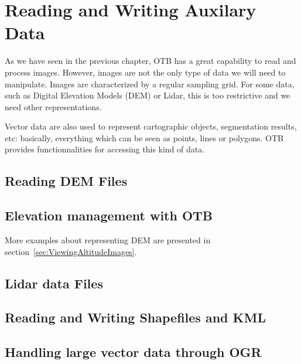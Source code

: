 \chapter{Reading and Writing Auxilary Data}
\label{sec:ReadingAuxData}

As we have seen in the previous chapter, OTB has a great capability to
read and process images. However, images are not the only type of data
we will need to manipulate. Images are characterized by a regular
sampling grid. For some data, such as Digital Elevation Models (DEM)
or Lidar, this is too restrictive and we need other representations.

Vector data are also used to represent cartographic objects,
segmentation results, etc: basically, everything which can be seen as
points, lines or polygons. OTB provides functionnalities for accessing
this kind of data.

\section{Reading DEM Files}
\label{sec:ReadDEM}


\section{Elevation management with OTB}
\ifitkFullVersion
\label{sec:DEMHandler}
\fi


More examples about representing DEM are presented in section~\ref{sec:ViewingAltitudeImages}.

\section{Lidar data Files}
\label{sec:ReadLidar}



\section{Reading and Writing Shapefiles and KML}
\label{sec:ReadVectorData}


\section{Handling large vector data through OGR}
\label{sec:OGRWrappers}


% 

